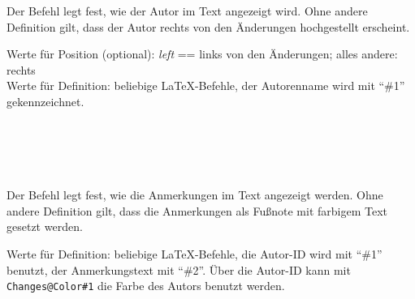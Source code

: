 \subsubsection{}
\DescribeMacro{\setauthormarkup}

Der Befehl  legt fest, wie der Autor im Text angezeigt wird.
Ohne andere Definition gilt, dass der Autor rechts von den Änderungen hochgestellt erscheint.

Werte für Position (optional): \emph{left} == links von den Änderungen; alles andere: rechts\\
Werte für Definition: beliebige \LaTeX-Befehle, der Autorenname wird mit "`\#1"' gekennzeichnet.
\begin{einspiel}
	\>
\end{einspiel}
\begin{einspiel}[true]
	\>\\
	\>\\
	\>\\
	\>
\end{einspiel}

\subsubsection{}
\DescribeMacro{\setremarkmarkup}

Der Befehl  legt fest, wie die Anmerkungen im Text angezeigt werden.
Ohne andere Definition gilt, dass die Anmerkungen als Fußnote mit farbigem Text gesetzt werden.

Werte für Definition: beliebige \LaTeX-Befehle, die Autor-ID wird mit "`\#1"' benutzt, der Anmerkungstext mit "`\#2"'.
Über die Autor-ID kann mit \texttt{Changes@Color\#1} die Farbe des Autors benutzt werden.
\begin{einspiel}
	\>
\end{einspiel}
\begin{einspiel}[true]
	\>\\
	\>
\end{einspiel}

